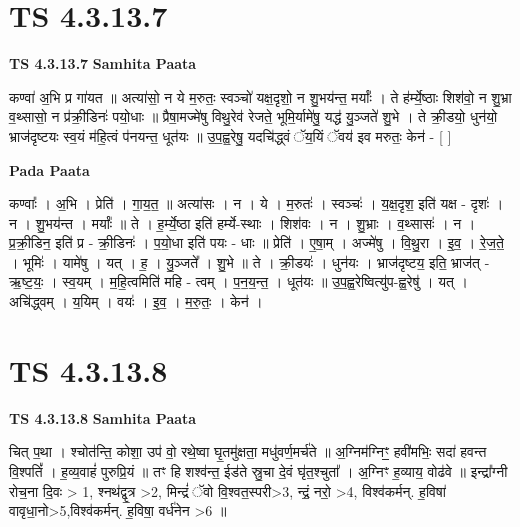 \documentclass[17pt]{extarticle}
\begin{document}

\section{ TS 4.3.13.7 }

\textbf{TS 4.3.13.7 } \newline
\textbf{Samhita Paata} \newline

कण्वा॑ अ॒भि प्र गा॑यत ॥ अत्या॑सो॒ न ये म॒रुतः॒ स्वञ्चो॑ यक्ष॒दृशो॒ न शु॒भय॑न्त॒ मर्याः᳚ । ते ह॑र्म्ये॒ष्ठाः शिश॑वो॒ न शु॒भ्रा व॒थ्सासो॒ न प्र॑क्री॒डिनः॑ पयो॒धाः ॥ प्रैषा॒मज्मे॑षु विथु॒रेव॑ रेजते॒ भूमि॒र्यामे॑षु॒ यद्ध॑ यु॒ञ्जते॑ शु॒भे । ते क्री॒डयो॒ धुन॑यो॒ भ्राज॑दृष्टयः स्व॒यं म॑हि॒त्वं प॑नयन्त॒ धूत॑यः ॥ उ॒प॒ह्व॒रेषु॒ यदचि॑द्ध्वं ॅय॒यिं ॅवय॑ इव मरुतः॒ केन॑ - [  ] \newline

\textbf{Pada Paata} \newline

कण्वाः᳚ । अ॒भि । प्रेति॑ । गा॒य॒त॒ ॥ अत्या॑सः । न । ये । म॒रुतः॑ । स्वञ्चः॑ । य॒क्ष॒दृश॒ इति॑ यक्ष - दृशः॑ । न । शु॒भय॑न्त । मर्याः᳚ ॥ ते । ह॒र्म्ये॒ष्ठा इति॑ हर्म्ये-स्थाः । शिश॑वः । न । शु॒भ्राः । व॒थ्सासः॑ । न । प्र॒क्री॒डिन॒ इति॑ प्र - क्री॒डिनः॑ । प॒यो॒धा इति॑ पयः - धाः ॥ प्रेति॑ । ए॒षा॒म् । अज्मे॑षु । वि॒थु॒रा । इ॒व॒ । रे॒ज॒ते॒ । भूमिः॑ । यामे॑षु । यत् । ह॒ । यु॒ञ्जते᳚ । शु॒भे ॥ ते । क्री॒डयः॑ । धुन॑यः । भ्राज॑दृष्टय॒ इति॒ भ्राज॑त् - ऋ॒ष्ट॒यः॒ । स्व॒यम् । म॒हि॒त्वमिति॑ महि - त्वम् । प॒न॒य॒न्त॒ । धूत॑यः ॥ उ॒प॒ह्व॒रेष्वित्यु॑प-ह्व॒रेषु॑ । यत् । अचि॑द्ध्वम् । य॒यिम् । वयः॑ । इ॒व॒ । म॒रु॒तः॒ । केन॑ ।  \newline





\section{ TS 4.3.13.8 }

\textbf{TS 4.3.13.8 } \newline
\textbf{Samhita Paata} \newline

चित् प॒था । श्चोत॑न्ति॒ कोशा॒ उप॑ वो॒ रथे॒ष्वा घृ॒तमु॑क्षता॒ मधु॑वर्ण॒मर्च॑ते ॥ अ॒ग्निम॑ग्निꣳ॒॒ हवी॑मभिः॒ सदा॑ हवन्त वि॒श्पतिं᳚ । ह॒व्य॒वाहं॑ पुरुप्रि॒यं ॥ तꣳ हि शश्व॑न्त॒ ईड॑ते स्रु॒चा दे॒वं घृ॑त॒श्चुता᳚ । अ॒ग्निꣳ ह॒व्याय॒ वोढ॑वे ॥ इन्द्रा᳚ग्नी रोच॒ना दि॒वः > 1, श्नथ॑द्वृ॒त्र >2, मिन्द्रं॑ ॅवो वि॒श्वत॒स्परी>3, न्द्रं॒ नरो॒ >4, विश्व॑कर्मन्. ह॒विषा॑ वावृधा॒नो>5,विश्व॑कर्मन्. ह॒विषा॒ वर्ध॑नेन >6 ॥ \newline
\end{document}
